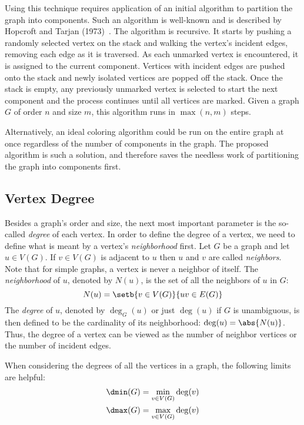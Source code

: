 Using this technique requires application of an initial algorithm to partition the graph into components.  Such an
algorithm is well-known and is described by Hopcroft and Tarjan (1973)~\cite{hopcroft}.  The algorithm is
recursive.  It starts by pushing a randomly selected vertex on the stack and walking the vertex's incident edges,
removing each edge as it is traversed.  As each unmarked vertex is encountered, it is assigned to the current
component.  Vertices with incident edges are pushed onto the stack and newly isolated vertices are popped off the
stack.  Once the stack is empty, any previously unmarked vertex is selected to start the next component and the
process continues until all vertices are marked.  Given a graph \(G\) of order \(n\) and size \(m\), this algorithm
runs in \(\max(n,m)\) steps.

Alternatively, an ideal coloring algorithm could be run on the entire graph at once regardless of the number of
components in the graph.  The proposed algorithm is such a solution, and therefore saves the needless work of
partitioning the graph into components first.

\subsection{Vertex Degree}\label{sec:sub:degree}

Besides a graph's order and size, the next most important parameter is the so-called \emph{degree} of each vertex.
In order to define the degree of a vertex, we need to define what is meant by a vertex's \emph{neighborhood} first.
Let \(G\) be a graph and let \(u\in V(G)\).  If \(v\in V(G)\) is adjacent to \(u\) then \(u\) and \(v\) are called
\emph{neighbors}.  Note that for simple graphs, a vertex is never a neighbor of itself.  The \emph{neighborhood} of
\(u\), denoted by \(N(u)\), is the set of all the neighbors of \(u\) in \(G\):
\[N(u)=\setb{v\in V(G)}{uv\in E(G)}\]
The \emph{degree} of \(u\), denoted by \(\deg_G(u)\) or just \(\deg(u)\) if \(G\) is unambiguous, is then defined
to be the cardinality of its neighborhood: \(\deg(u)=\abs{N(u)}\).  Thus, the degree of a vertex can be viewed as
the number of neighbor vertices or the number of incident edges.

When considering the degrees of all the vertices in a graph, the following limits are helpful:
\begin{gather*}
  \dmin(G)=\min_{v\in V(G)}\deg(v) \\
  \dmax(G)=\max_{v\in V(G)}\deg(v)
\end{gather*}

